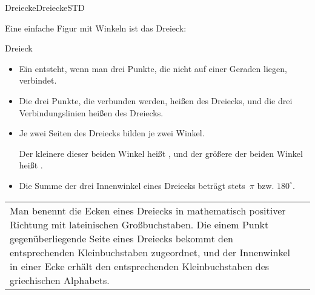 \begin{MXContent}{Dreiecke}{Dreiecke}{STD}

Eine einfache Figur mit Winkeln ist das Dreieck:
\begin{MXInfo}{Dreieck}%
\begin{itemize}
 \item Ein  entsteht,
       wenn man drei Punkte, die nicht auf einer Geraden liegen, verbindet.
       
 \item Die drei Punkte, die verbunden werden, hei\ss en
        des Dreiecks, und
       die drei Verbindungslinien hei\ss en
        des Dreiecks.
       
 \item Je zwei Seiten des Dreiecks bilden je zwei Winkel.
   
       Der kleinere dieser beiden Winkel hei\ss t
       ,
       und der gr\"o\ss ere der beiden Winkel hei\ss t
       .
 
 \item Die Summe der drei Innenwinkel eines Dreiecks betr\"agt stets~$\pi$ bzw. $180^\circ$.
\end{itemize}
\end{MXInfo}

\begin{tabular}{lr}
\begin{minipage}{10cm}
Man benennt die Ecken eines Dreiecks in mathematisch positiver Richtung mit lateinischen Gro\ss buchstaben. Die einem Punkt gegen\"uberliegende
Seite eines Dreiecks bekommt den entsprechenden Kleinbuchstaben zugeordnet, und
der Innenwinkel in einer Ecke erh\"alt den entsprechenden Kleinbuchstaben des
griechischen Alphabets.


\end{minipage}
\end{tabular}
\end{MXContent}

